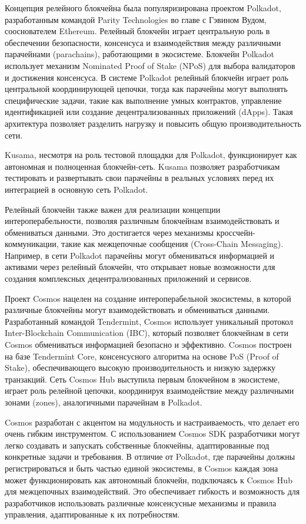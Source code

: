 Концепция релейного блокчейна была популяризирована проектом Polkadot, разработанным командой Parity Technologies во главе с Гэвином Вудом, сооснователем Ethereum. Релейный блокчейн играет центральную роль в обеспечении безопасности, консенсуса и взаимодействия между различными парачейнами (parachains), работающими в экосистеме. Блокчейн Polkadot использует механизм Nominated Proof of Stake (NPoS) для выбора валидаторов и достижения консенсуса. В системе Polkadot релейный блокчейн играет роль центральной координирующей цепочки, тогда как парачейны могут выполнять специфические задачи, такие как выполнение умных контрактов, управление идентификацией или создание децентрализованных приложений (dApps). Такая архитектура позволяет разделить нагрузку и повысить общую производительность сети.

Kusama, несмотря на роль тестовой площадки для Polkadot, функционирует как автономная и полноценная блокчейн-сеть. Kusama позволяет разработчикам тестировать и развертывать свои парачейны в реальных условиях перед их интеграцией в основную сеть Polkadot.

Релейный блокчейн также важен для реализации концепции интероперабельности, позволяя различным блокчейнам взаимодействовать и обмениваться данными. Это достигается через механизмы кроссчейн-коммуникации, такие как межцепочные сообщения (Cross-Chain Messaging). Например, в сети Polkadot парачейны могут обмениваться информацией и активами через релейный блокчейн, что открывает новые возможности для создания комплексных децентрализованных приложений и сервисов.

Проект Cosmos нацелен на создание интероперабельной экосистемы, в которой различные блокчейны могут взаимодействовать и обмениваться данными. Разработанный командой Tendermint, Cosmos использует уникальный протокол Inter-Blockchain Communication (IBC), который позволяет блокчейнам в сети Cosmos обмениваться информацией безопасно и эффективно. Cosmos построен на базе Tendermint Core, консенсусного алгоритма на основе PoS (Proof of Stake), обеспечивающего высокую производительность и низкую задержку транзакций. Сеть Cosmos Hub выступила первым блокчейном в экосистеме, играет роль релейной цепочки, координируя взаимодействие между различными зонами (zones), аналогичными парачейнам в Polkadot.

Cosmos разработан с акцентом на модульность и настраиваемость, что делает его очень гибким инструментом. С использованием Cosmos SDK разработчики могут легко создавать и запускать собственные блокчейны, адаптированные под конкретные задачи и требования. В отличие от Polkadot, где парачейны должны регистрироваться и быть частью единой экосистемы, в Cosmos каждая зона может функционировать как автономный блокчейн, подключаясь к Cosmos Hub для межцепочных взаимодействий. Это обеспечивает гибкость и возможность для разработчиков использовать различные консенсусные механизмы и правила управления, адаптированные к их потребностям.

